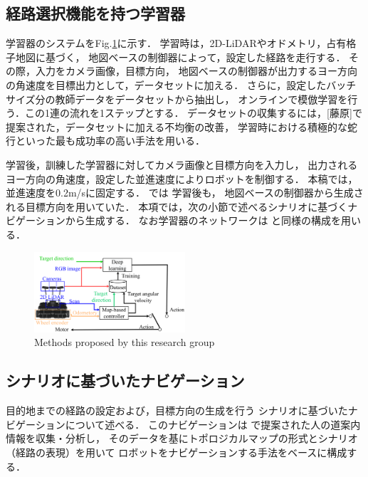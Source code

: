 \documentclass{sice-si}
\begin{document}
\subsection{経路選択機能を持つ学習器}
学習器のシステムをFig.\ref{fig:learning}に示す．
学習時は，2D-LiDARやオドメトリ，占有格子地図に基づく，
地図ベースの制御器によって，設定した経路を走行する．
その際，入力をカメラ画像，目標方向，
地図ベースの制御器が出力するヨー方向の角速度を目標出力として，データセットに加える．
さらに，設定したバッチサイズ分の教師データをデータセットから抽出し，
オンラインで模倣学習を行う．この1連の流れを1ステップとする．
データセットの収集するには，[藤原]で提案された，データセットに加える不均衡の改善，
学習時における積極的な蛇行といった最も成功率の高い手法を用いる．\par
学習後，訓練した学習器に対してカメラ画像と目標方向を入力し，
出力されるヨー方向の角速度，設定した並進速度によりロボットを制御する．
本稿では，並進速度を0.2m/sに固定する．
\cite{haruyama2022}\cite{fujiwara2023}では
学習後も，
地図ベースの制御器から生成される目標方向を用いていた．
本項では，次の小節で述べるシナリオに基づくナビゲーションから生成する．
なお学習器のネットワークは
\cite{haruyama2022}\cite{fujiwara2023}
と同様の構成を用いる．
\begin{figure}[h!]
    \centering
     \includegraphics[height=30mm]{./figs/lerning_sys.png}
     \caption{Methods proposed by this research group}\label{fig:learning}
\end{figure}
\subsection{シナリオに基づいたナビゲーション}
目的地までの経路の設定および，目標方向の生成を行う
シナリオに基づいたナビゲーションについて述べる．
このナビゲーションは\cite{shimada2020}
で提案された人の道案内情報を収集・分析し，
そのデータを基にトポロジカルマップの形式とシナリオ（経路の表現）を用いて
ロボットをナビゲーションする手法をベースに構成する．
\end{document}
